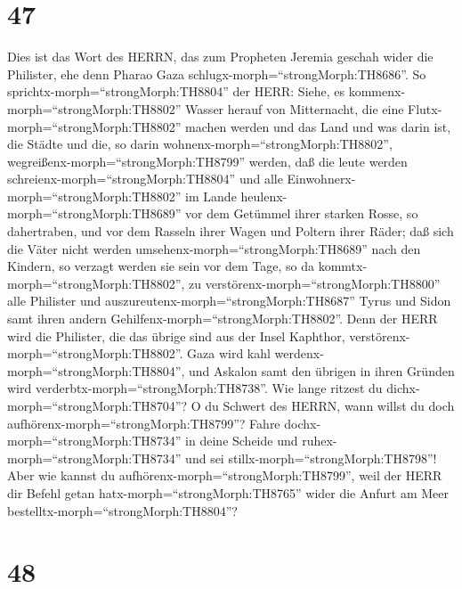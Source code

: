 \hypertarget{section-46}{%
\section{47}\label{section-46}}

 Dies ist das Wort des HERRN, das zum Propheten Jeremia
geschah wider die Philister, ehe denn Pharao Gaza
schlugx-morph=``strongMorph:TH8686''.  So
sprichtx-morph=``strongMorph:TH8804'' der HERR: Siehe, es
kommenx-morph=``strongMorph:TH8802'' Wasser herauf von Mitternacht, die
eine Flutx-morph=``strongMorph:TH8802'' machen werden und das Land und
was darin ist, die Städte und die, so darin
wohnenx-morph=``strongMorph:TH8802'',
wegreißenx-morph=``strongMorph:TH8799'' werden, daß die leute werden
schreienx-morph=``strongMorph:TH8804'' und alle
Einwohnerx-morph=``strongMorph:TH8802'' im Lande
heulenx-morph=``strongMorph:TH8689''  vor dem Getümmel ihrer
starken Rosse, so dahertraben, und vor dem Rasseln ihrer Wagen und
Poltern ihrer Räder; daß sich die Väter nicht werden
umsehenx-morph=``strongMorph:TH8689'' nach den Kindern, so verzagt
werden sie sein  vor dem Tage, so da
kommtx-morph=``strongMorph:TH8802'', zu
verstörenx-morph=``strongMorph:TH8800'' alle Philister und
auszureutenx-morph=``strongMorph:TH8687'' Tyrus und Sidon samt ihren
andern Gehilfenx-morph=``strongMorph:TH8802''. Denn der HERR wird die
Philister, die das übrige sind aus der Insel Kaphthor,
verstörenx-morph=``strongMorph:TH8802''.  Gaza wird kahl
werdenx-morph=``strongMorph:TH8804'', und Askalon samt den übrigen in
ihren Gründen wird verderbtx-morph=``strongMorph:TH8738''. Wie lange
ritzest du dichx-morph=``strongMorph:TH8704''?  O du Schwert
des HERRN, wann willst du doch aufhörenx-morph=``strongMorph:TH8799''?
Fahre dochx-morph=``strongMorph:TH8734'' in deine Scheide und
ruhex-morph=``strongMorph:TH8734'' und sei
stillx-morph=``strongMorph:TH8798''!  Aber wie kannst du
aufhörenx-morph=``strongMorph:TH8799'', weil der HERR dir Befehl getan
hatx-morph=``strongMorph:TH8765'' wider die Anfurt am Meer
bestelltx-morph=``strongMorph:TH8804''?

\hypertarget{section-47}{%
\section{48}\label{section-47}}

